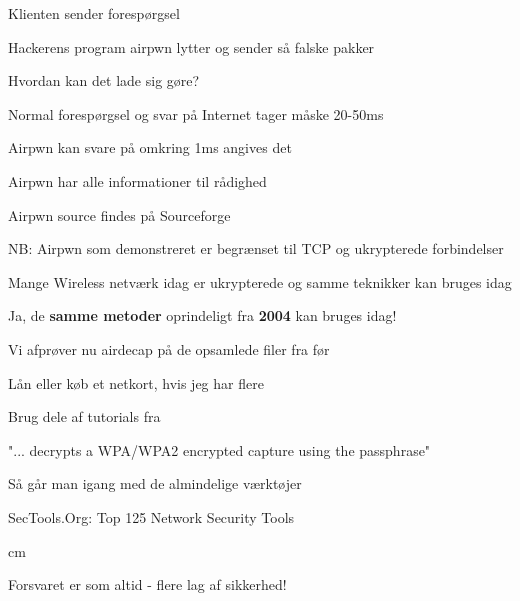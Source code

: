 \documentclass[20pt,landscape,a4paper,footrule]{foils}
\begin{document}
\begin{list1}
\item Klienten sender forespørgsel
\item Hackerens program airpwn lytter og sender så falske pakker
\item Hvordan kan det lade sig gøre?
\begin{list2}
\item Normal forespørgsel og svar på Internet tager måske 20-50ms
\item Airpwn kan svare på omkring 1ms angives det
\item Airpwn har alle informationer til rådighed
\end{list2}
\item Airpwn source findes på Sourceforge\\
\item NB: Airpwn som demonstreret er begrænset til TCP og ukrypterede
  forbindelser
\item Mange Wireless netværk idag er ukrypterede og samme teknikker kan bruges idag
\end{list1}

\centerline{Ja, de {\bf samme metoder} oprindeligt fra {\bf 2004} kan bruges idag!}



\begin{list1}
\item Vi afprøver nu airdecap på de opsamlede filer fra før
\item Lån eller køb et netkort, hvis jeg har flere
\item Brug dele af tutorials fra\\
\item "... decrypts a WPA/WPA2 encrypted capture using the passphrase"
\end{list1}




\begin{list1}
\item Så går man igang med de almindelige værktøjer
\item SecTools.Org: Top 125 Network Security Tools 
\end{list1}
 cm

\centerline{\hlkbig Forsvaret er som altid - flere lag af sikkerhed! }
\end{document}
